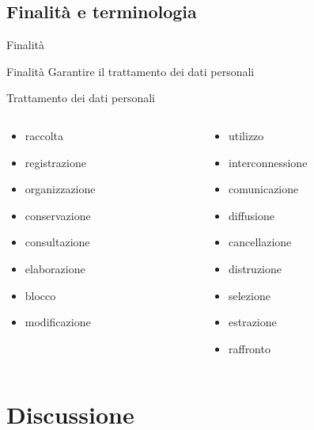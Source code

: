 \documentclass[italian]{beamer}
\begin{document}
\subsection{Finalit\`a e terminologia}

\begin{frame}{Finalit\`a}
	\begin{block}{Finalit\`a}
		Garantire il trattamento dei dati personali
	\end{block}
\end{frame}

\begin{frame} %
	{Trattamento dei dati personali}
	\begin{columns}
		\begin{column}{0.45\textwidth}
		\begin{itemize}
			\item raccolta
			\item registrazione
			\item organizzazione
			\item conservazione
			\item consultazione
			\item elaborazione
			\item blocco
			\item modificazione
		\end{itemize}
		\end{column}
		\begin{column}{0.45\textwidth}
		\begin{itemize}
			\item utilizzo
			\item interconnessione
			\item comunicazione
			\item diffusione
			\item cancellazione
			\item distruzione
			\item selezione
			\item estrazione
			\item raffronto
		\end{itemize}
	\end{column}
	\end{columns}
\end{frame}

\section{Discussione}
\end{document}
